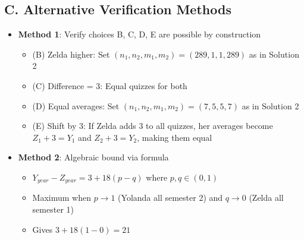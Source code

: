 \documentclass[12pt]{article}
\begin{document}
\begin{verificationbox}
\subsection*{C. Alternative Verification Methods}
\begin{itemize}[leftmargin=*]
    \item \textbf{Method 1}: Verify choices B, C, D, E are possible by construction
    \begin{itemize}
        \item (B) Zelda higher: Set $(n_1, n_2, m_1, m_2) = (289, 1, 1, 289)$ as in Solution 2
        \item (C) Difference = 3: Equal quizzes for both
        \item (D) Equal averages: Set $(n_1, n_2, m_1, m_2) = (7, 5, 5, 7)$ as in Solution 2
        \item (E) Shift by 3: If Zelda adds 3 to all quizzes, her averages become $Z_1 + 3 = Y_1$ and $Z_2 + 3 = Y_2$, making them equal
    \end{itemize}
    \item \textbf{Method 2}: Algebraic bound via formula
    \begin{itemize}
        \item $Y_{year} - Z_{year} = 3 + 18(p - q)$ where $p, q \in (0, 1)$
        \item Maximum when $p \to 1$ (Yolanda all semester 2) and $q \to 0$ (Zelda all semester 1)
        \item Gives $3 + 18(1 - 0) = 21$ \checkmark
    \end{itemize}
\end{itemize}
\end{verificationbox}
\end{document}
